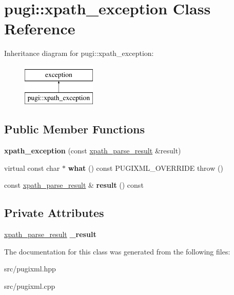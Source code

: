 \hypertarget{classpugi_1_1xpath__exception}{}\section{pugi\+:\+:xpath\+\_\+exception Class Reference}
\label{classpugi_1_1xpath__exception}
Inheritance diagram for pugi\+:\+:xpath\+\_\+exception\+:\begin{figure}[H]
\begin{center}
\leavevmode
\includegraphics[height=2.000000cm]{classpugi_1_1xpath__exception}
\end{center}
\end{figure}
\subsection*{Public Member Functions}
\begin{DoxyCompactItemize}
\item 
\mbox{\label{classpugi_1_1xpath__exception_a67698821481b5a73213d21a1ac174410}} 
{\bfseries xpath\+\_\+exception} (const \hyperlink{structpugi_1_1xpath__parse__result}{xpath\+\_\+parse\+\_\+result} \&result)
\item 
\mbox{\label{classpugi_1_1xpath__exception_a3451312335446d093e4e5382dc18bd27}} 
virtual const char $\ast$ {\bfseries what} () const P\+U\+G\+I\+X\+M\+L\+\_\+\+O\+V\+E\+R\+R\+I\+DE  throw ()
\item 
\mbox{\label{classpugi_1_1xpath__exception_a65b07de5765784b3e9fe07b33fb5c2bc}} 
const \hyperlink{structpugi_1_1xpath__parse__result}{xpath\+\_\+parse\+\_\+result} \& {\bfseries result} () const
\end{DoxyCompactItemize}
\subsection*{Private Attributes}
\begin{DoxyCompactItemize}
\item 
\mbox{\label{classpugi_1_1xpath__exception_abf02b8aea077550df530acc5a0a78f9e}} 
\hyperlink{structpugi_1_1xpath__parse__result}{xpath\+\_\+parse\+\_\+result} {\bfseries \+\_\+result}
\end{DoxyCompactItemize}


The documentation for this class was generated from the following files\+:\begin{DoxyCompactItemize}
\item 
src/pugixml.\+hpp\item 
src/pugixml.\+cpp\end{DoxyCompactItemize}
